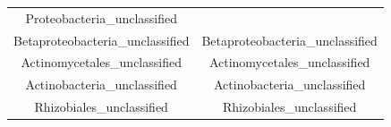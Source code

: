 \documentclass[]{article}
\begin{document}
\begin{longtable}[]{@{}cc@{}}
\begin{minipage}[t]{0.44\columnwidth}
Proteobacteria\_unclassified\strut
\end{minipage}\tabularnewline
\begin{minipage}[t]{0.44\columnwidth}\centering\strut
Betaproteobacteria\_unclassified\strut
\end{minipage} & \begin{minipage}[t]{0.44\columnwidth}\centering\strut
Betaproteobacteria\_unclassified\strut
\end{minipage}\tabularnewline
\begin{minipage}[t]{0.44\columnwidth}\centering\strut
Actinomycetales\_unclassified\strut
\end{minipage} & \begin{minipage}[t]{0.44\columnwidth}\centering\strut
Actinomycetales\_unclassified\strut
\end{minipage}\tabularnewline
\begin{minipage}[t]{0.44\columnwidth}\centering\strut
Actinobacteria\_unclassified\strut
\end{minipage} & \begin{minipage}[t]{0.44\columnwidth}\centering\strut
Actinobacteria\_unclassified\strut
\end{minipage}\tabularnewline
\begin{minipage}[t]{0.44\columnwidth}\centering\strut
Rhizobiales\_unclassified\strut
\end{minipage} & \begin{minipage}[t]{0.44\columnwidth}\centering\strut
Rhizobiales\_unclassified\strut
\end{minipage}\tabularnewline
\bottomrule
\end{longtable}
\end{document}
